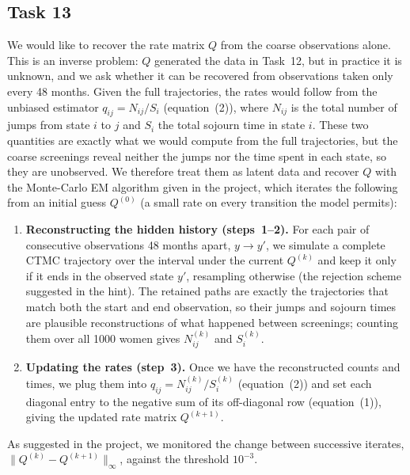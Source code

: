 \subsection*{Task 13}

We would like to recover the rate matrix $Q$ from the coarse observations alone.
This is an inverse problem: $Q$ generated the data in Task~12, but in practice it
is unknown, and we ask whether it can be recovered from observations taken only
every 48 months. Given the full trajectories, the
rates would follow from the unbiased estimator $q_{ij} = N_{ij}/S_i$
(equation~(2)), where $N_{ij}$ is the total number of jumps from state $i$ to $j$
and $S_i$ the total sojourn time in state $i$. These two quantities are exactly
what we would compute from the full trajectories, but the coarse screenings reveal
neither the jumps nor the time spent in each state, so they are unobserved. We
therefore treat them as latent data and recover $Q$ with the Monte-Carlo EM
algorithm given in the project, which iterates the following from an initial guess
$Q^{(0)}$ (a small rate on every transition the model permits):

\begin{enumerate}
    \item \textbf{Reconstructing the hidden history (steps~1--2).} For each pair of
          consecutive observations 48 months apart, $y \to y'$, we simulate a
          complete CTMC trajectory over the interval under the current $Q^{(k)}$
          and keep it only if it ends in the observed state $y'$, resampling
          otherwise (the rejection scheme suggested in the hint). The retained
          paths are exactly the trajectories that match both the start and end
          observation, so their jumps and sojourn times are plausible
          reconstructions of what happened between screenings; counting them over
          all 1000 women gives $N_{ij}^{(k)}$ and $S_i^{(k)}$.
    \item \textbf{Updating the rates (step~3).} Once we have the reconstructed
          counts and times, we plug them into $q_{ij} = N_{ij}^{(k)}/S_i^{(k)}$
          (equation~(2)) and set each diagonal entry to the negative sum of its
          off-diagonal row (equation~(1)), giving the updated rate matrix
          $Q^{(k+1)}$.
\end{enumerate}

As suggested in the project, we monitored the change between successive iterates,
$\|Q^{(k)} - Q^{(k+1)}\|_\infty$, against the threshold $10^{-3}$.